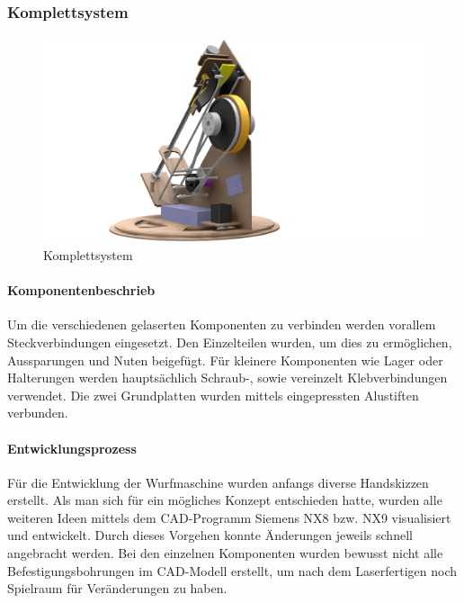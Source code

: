 \subsubsection{Komplettsystem}
\begin{figure}[h!]
	\centering
	\includegraphics[width=\linewidth]{../../fig/Komplettsystem}
	\caption{Komplettsystem}
	\label{fig:Komplettsystem}
\end{figure}
\paragraph{Komponentenbeschrieb}

Um die verschiedenen gelaserten Komponenten zu verbinden werden vorallem Steckverbindungen eingesetzt. Den Einzelteilen wurden, um dies zu ermöglichen, Aussparungen und Nuten beigefügt. Für kleinere Komponenten wie Lager oder Halterungen werden hauptsächlich Schraub-, sowie vereinzelt Klebverbindungen verwendet. Die zwei Grundplatten wurden mittels eingepressten Alustiften verbunden. 

\paragraph{Entwicklungsprozess}

Für die Entwicklung der Wurfmaschine wurden anfangs diverse Handskizzen erstellt. Als man sich für ein mögliches Konzept entschieden hatte, wurden alle weiteren Ideen mittels dem CAD-Programm Siemens NX8 bzw. NX9 visualisiert und entwickelt. Durch dieses Vorgehen konnte Änderungen jeweils schnell angebracht werden. Bei den einzelnen Komponenten wurden bewusst nicht alle Befestigungsbohrungen im CAD-Modell erstellt, um nach dem Laserfertigen noch Spielraum für Veränderungen zu haben.